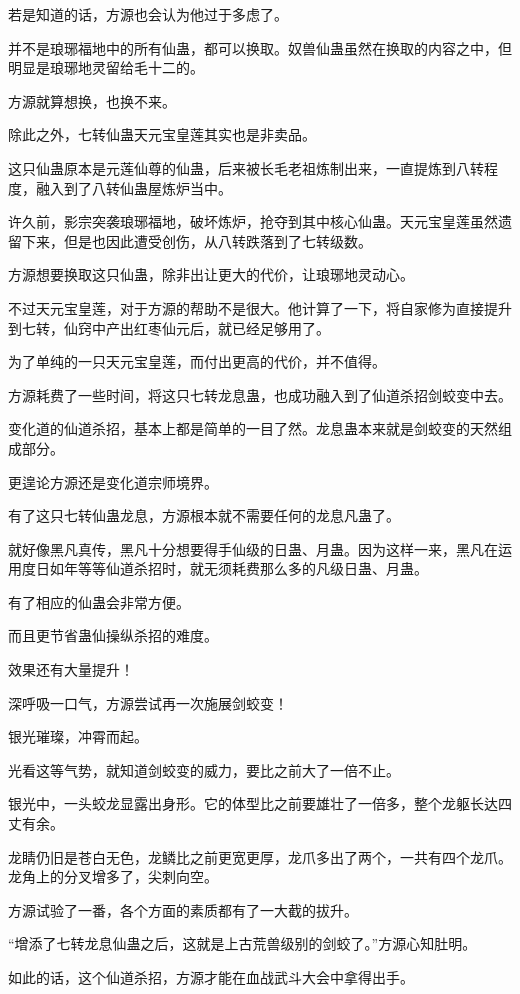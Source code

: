 \begin{this_body}
若是知道的话，方源也会认为他过于多虑了。

并不是琅琊福地中的所有仙蛊，都可以换取。奴兽仙蛊虽然在换取的内容之中，但明显是琅琊地灵留给毛十二的。

方源就算想换，也换不来。

除此之外，七转仙蛊天元宝皇莲其实也是非卖品。

这只仙蛊原本是元莲仙尊的仙蛊，后来被长毛老祖炼制出来，一直提炼到八转程度，融入到了八转仙蛊屋炼炉当中。

许久前，影宗突袭琅琊福地，破坏炼炉，抢夺到其中核心仙蛊。天元宝皇莲虽然遗留下来，但是也因此遭受创伤，从八转跌落到了七转级数。

方源想要换取这只仙蛊，除非出让更大的代价，让琅琊地灵动心。

不过天元宝皇莲，对于方源的帮助不是很大。他计算了一下，将自家修为直接提升到七转，仙窍中产出红枣仙元后，就已经足够用了。

为了单纯的一只天元宝皇莲，而付出更高的代价，并不值得。

方源耗费了一些时间，将这只七转龙息蛊，也成功融入到了仙道杀招剑蛟变中去。

变化道的仙道杀招，基本上都是简单的一目了然。龙息蛊本来就是剑蛟变的天然组成部分。

更遑论方源还是变化道宗师境界。

有了这只七转仙蛊龙息，方源根本就不需要任何的龙息凡蛊了。

就好像黑凡真传，黑凡十分想要得手仙级的日蛊、月蛊。因为这样一来，黑凡在运用度日如年等等仙道杀招时，就无须耗费那么多的凡级日蛊、月蛊。

有了相应的仙蛊会非常方便。

而且更节省蛊仙操纵杀招的难度。

效果还有大量提升！

深呼吸一口气，方源尝试再一次施展剑蛟变！

银光璀璨，冲霄而起。

光看这等气势，就知道剑蛟变的威力，要比之前大了一倍不止。

银光中，一头蛟龙显露出身形。它的体型比之前要雄壮了一倍多，整个龙躯长达四丈有余。

龙睛仍旧是苍白无色，龙鳞比之前更宽更厚，龙爪多出了两个，一共有四个龙爪。龙角上的分叉增多了，尖刺向空。

方源试验了一番，各个方面的素质都有了一大截的拔升。

“增添了七转龙息仙蛊之后，这就是上古荒兽级别的剑蛟了。”方源心知肚明。

如此的话，这个仙道杀招，方源才能在血战武斗大会中拿得出手。


\end{this_body}
